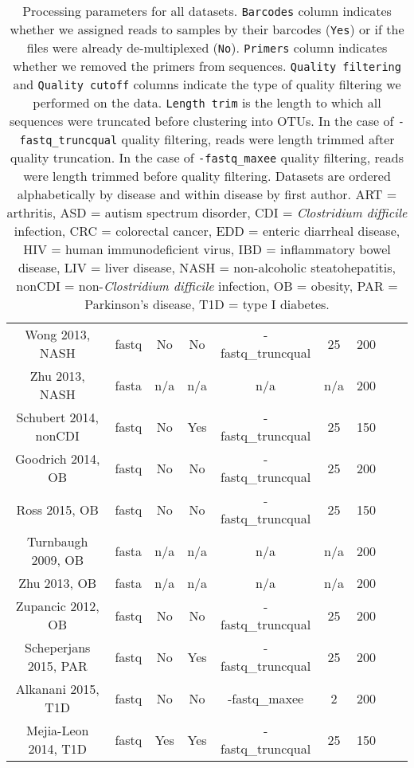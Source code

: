 \documentclass{article}
\begin{document}
{{\begin{table}[h]
{\begin{tabular}{c c c c c c c c c}
	Wong 2013, NASH & fastq & No & No & -fastq\_truncqual & 25 & 200 \\ 
	Zhu 2013, NASH & fasta & n/a & n/a & n/a & n/a & 200 \\ 
	Schubert 2014, nonCDI & fastq & No & Yes & -fastq\_truncqual & 25 & 150 \\ 
	Goodrich 2014, OB & fastq & No & No & -fastq\_truncqual & 25 & 200 \\ 
	Ross 2015, OB & fastq & No & No & -fastq\_truncqual & 25 & 150 \\ 
	Turnbaugh 2009, OB & fasta & n/a & n/a & n/a & n/a & 200 \\ 
	Zhu 2013, OB & fasta & n/a & n/a & n/a & n/a & 200 \\ 
	Zupancic 2012, OB & fastq & No & No & -fastq\_truncqual & 25 & 200 \\ 
	Scheperjans 2015, PAR & fastq & No & Yes & -fastq\_truncqual & 25 & 200 \\ 
	Alkanani 2015, T1D & fastq & No & No & -fastq\_maxee & 2 & 200 \\ 
	Mejia-Leon 2014, T1D & fastq & Yes & Yes & -fastq\_truncqual & 25 & 150 \\ 
	\hline
\end{tabular}}
\caption{Processing parameters for all datasets. \texttt{Barcodes} column indicates whether we assigned reads to samples by their barcodes (\texttt{Yes}) or if the files were already de-multiplexed (\texttt{No}). \texttt{Primers} column indicates whether we removed the primers from sequences. \texttt{Quality filtering} and \texttt{Quality cutoff} columns indicate the type of quality filtering we performed on the data. \texttt{Length trim} is the length to which all sequences were truncated before clustering into OTUs. In the case of \texttt{-fastq\_truncqual} quality filtering, reads were length trimmed after quality truncation. In the case of \texttt{-fastq\_maxee} quality filtering, reads were length trimmed before quality filtering. Datasets are ordered alphabetically by disease and within disease by first author. ART = arthritis, ASD = autism spectrum disorder, CDI = \textit{Clostridium difficile} infection, CRC = colorectal cancer, EDD = enteric diarrheal disease, HIV = human immunodeficient virus, IBD = inflammatory bowel disease, LIV = liver disease, NASH = non-alcoholic steatohepatitis, nonCDI = non-\textit{Clostridium difficile} infection, OB = obesity, PAR = Parkinson's disease, T1D = type I diabetes.}\label{tab:processing}
\end{table}
}

}
\end{document}

